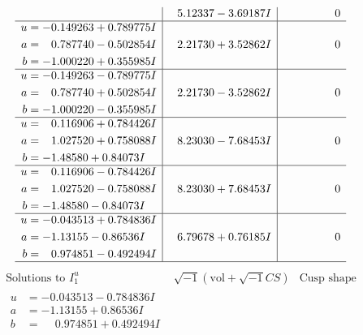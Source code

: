 \documentclass[1p]{elsarticle_modified}
\theoremstyle{definition}
\newcommand{\I}{\sqrt{-1}}
\begin{document}
$$\begin{array}{c|c|c}
 & \phantom{-}5.12337 - 3.69187 I & \phantom{-0.000000 } 0 \\ \hline\begin{aligned}
u &= -0.149263 + 0.789775 I \\
a &= \phantom{-}0.787740 - 0.502854 I \\
b &= -1.000220 + 0.355985 I\end{aligned}
 & \phantom{-}2.21730 + 3.52862 I & \phantom{-0.000000 } 0 \\ \hline\begin{aligned}
u &= -0.149263 - 0.789775 I \\
a &= \phantom{-}0.787740 + 0.502854 I \\
b &= -1.000220 - 0.355985 I\end{aligned}
 & \phantom{-}2.21730 - 3.52862 I & \phantom{-0.000000 } 0 \\ \hline\begin{aligned}
u &= \phantom{-}0.116906 + 0.784426 I \\
a &= \phantom{-}1.027520 + 0.758088 I \\
b &= -1.48580 + 0.84073 I\end{aligned}
 & \phantom{-}8.23030 - 7.68453 I & \phantom{-0.000000 } 0 \\ \hline\begin{aligned}
u &= \phantom{-}0.116906 - 0.784426 I \\
a &= \phantom{-}1.027520 - 0.758088 I \\
b &= -1.48580 - 0.84073 I\end{aligned}
 & \phantom{-}8.23030 + 7.68453 I & \phantom{-0.000000 } 0 \\ \hline\begin{aligned}
u &= -0.043513 + 0.784836 I \\
a &= -1.13155 - 0.86536 I \\
b &= \phantom{-}0.974851 - 0.492494 I\end{aligned}
 & \phantom{-}6.79678 + 0.76185 I & \phantom{-0.000000 } 0\\
 \hline 
 \end{array}$$\newpage$$\begin{array}{c|c|c}  
\text{Solutions to }I^u_{1}& \I (\text{vol} + \sqrt{-1}CS) & \text{Cusp shape}\\
 \hline 
\begin{aligned}
u &= -0.043513 - 0.784836 I \\
a &= -1.13155 + 0.86536 I \\
b &= \phantom{-}0.974851 + 0.492494 I\end{aligned}

\end{array}$$
\end{document}
